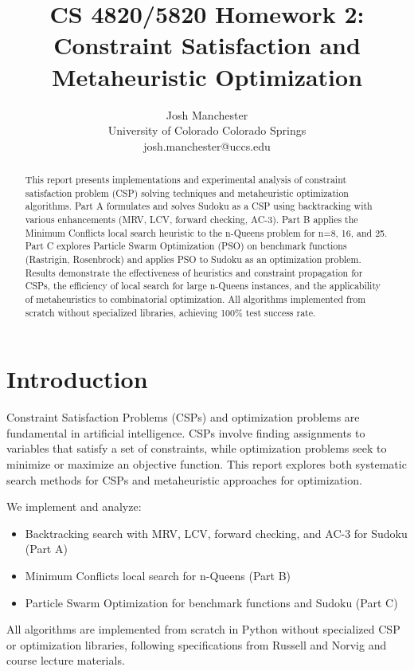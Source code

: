 \documentclass[letterpaper]{article}
\title{CS 4820/5820 Homework 2:\\
Constraint Satisfaction and Metaheuristic Optimization}
\author{
Josh Manchester\\
University of Colorado Colorado Springs\\
josh.manchester@uccs.edu
}
\begin{document}
\maketitle

\begin{abstract}
This report presents implementations and experimental analysis of constraint satisfaction problem (CSP) solving techniques and metaheuristic optimization algorithms. Part A formulates and solves Sudoku as a CSP using backtracking with various enhancements (MRV, LCV, forward checking, AC-3). Part B applies the Minimum Conflicts local search heuristic to the n-Queens problem for n=8, 16, and 25. Part C explores Particle Swarm Optimization (PSO) on benchmark functions (Rastrigin, Rosenbrock) and applies PSO to Sudoku as an optimization problem. Results demonstrate the effectiveness of heuristics and constraint propagation for CSPs, the efficiency of local search for large n-Queens instances, and the applicability of metaheuristics to combinatorial optimization. All algorithms implemented from scratch without specialized libraries, achieving 100\% test success rate.
\end{abstract}

\section{Introduction}

Constraint Satisfaction Problems (CSPs) and optimization problems are fundamental in artificial intelligence. CSPs involve finding assignments to variables that satisfy a set of constraints, while optimization problems seek to minimize or maximize an objective function. This report explores both systematic search methods for CSPs and metaheuristic approaches for optimization.

We implement and analyze:
\begin{itemize}
\item Backtracking search with MRV, LCV, forward checking, and AC-3 for Sudoku (Part A)
\item Minimum Conflicts local search for n-Queens (Part B)
\item Particle Swarm Optimization for benchmark functions and Sudoku (Part C)
\end{itemize}

All algorithms are implemented from scratch in Python without specialized CSP or optimization libraries, following specifications from Russell and Norvig \cite{russell2020} and course lecture materials.
\end{document}
